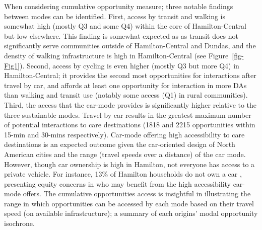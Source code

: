 \documentclass[
  authoryear,
  preprint,
  3p]{elsarticle}
\begin{document}
When considering cumulative opportunity measure; three notable findings
between modes can be identified. First, access by transit and walking is
somewhat high (mostly Q3 and some Q4) within the core of
Hamilton-Central but low elsewhere. This finding is somewhat expected as
as transit does not significantly serve communities outside of
Hamilton-Central and Dundas, and the density of walking infrastructure
is high in Hamilton-Central (see Figure~\ref{fig-Fig1}). Second, access
by cycling is even higher (mostly Q3 but more Q4) in Hamilton-Central;
it provides the second most opportunities for interactions after travel
by car, and affords at least one opportunity for interaction in more DAs
than walking and transit use (notably some access (Q1) in rural
communities). Third, the access that the car-mode provides is
significantly higher relative to the three sustainable modes. Travel by
car results in the greatest maximum number of potential interactions to
care destinations (1818 and 2215 opportunities within 15-min and 30-mins
respectively). Car-mode offering high accessibility to care destinations
is an expected outcome given the car-oriented design of North American
cities \citep{saeidizandRevisitingCarDependency2022} and the range
(travel speeds over a distance) of the car mode. However, though car
ownership is high in Hamilton, not everyone has access to a private
vehicle. For instance, 13\% of Hamilton households do not own a car
\citep{datamanagementgroupTTSTransportationTomorrow2018}, presenting
equity concerns in who may benefit from the high accessibility car-mode
offers. The cumulative opportunities access is insightful in
illustrating the range in which opportunities can be accessed by each
mode based on their travel speed (on available infrastructure); a
summary of each origins' modal opportunity isochrone.
\end{document}
